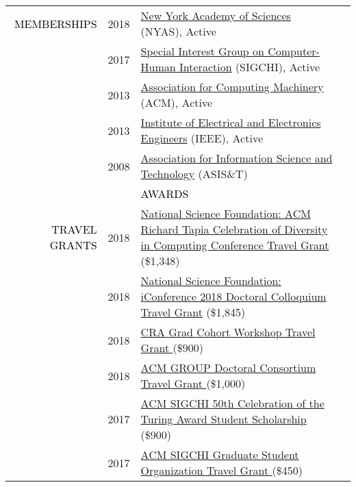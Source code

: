 \documentclass[12pt]{article}
\begin{document}
{{\begin{longtable}{Rp{1.0in}p{0.25in}p{4.75in}}
\textcolor{black}{\footnotesize{\uppercase{Memberships}}} & \footnotesize{2018} & \href{https://www.nyas.org/}{{New York Academy of Sciences}} (NYAS), Active \\

 & \footnotesize{2017} & \href{http://www.sigchi.org/}{{Special Interest Group on Computer-Human Interaction}} (SIGCHI), Active \\

& \footnotesize{2013} & \href{https://www.acm.org/}{{Association for Computing Machinery}} (ACM), Active \\

& \footnotesize{2013} & \href{https://www.ieee.org/}{{Institute of Electrical and Electronics Engineers}} (IEEE), Active \\

& \footnotesize{2008} & \href{https://www.asist.org/}{{Association for Information Science and Technology}} (ASIS\&T)
\bigskip \\

&&\par \Large \textcolor{black}{\uppercase{Awards}}\\ \hhline{~~-}

\textcolor{black}{\footnotesize{\uppercase{Travel Grants}}} & \footnotesize{2018} & \href{https://www.nsf.gov/awardsearch/showAward?AWD_ID=1823052}{{National Science Foundation: ACM Richard Tapia Celebration of Diversity in Computing Conference Travel Grant}} (\$1,348) \\

& \footnotesize{2018} & \href{https://www.nsf.gov/awardsearch/showAward?AWD_ID=1713738}{{National Science Foundation: iConference 2018 Doctoral Colloquium Travel Grant}} (\$1,845) \\

& \footnotesize{2018} & \href{https://cra.org/events/urmgradcohort/}{{CRA Grad Cohort Workshop Travel Grant} }(\$900) \\

& \footnotesize{2018} & \href{https://dl.acm.org/citation.cfm?id=3148330}{{ACM GROUP Doctoral Consortium Travel Grant} }(\$1,000) \\

& \footnotesize{2017} & \href{http://www.sigchi.org/news/sigchi-sponsors-students-to-attend-turing-award-celebration}{{ACM SIGCHI 50th Celebration of the Turing Award Student Scholarship} }(\$900) \\

& \footnotesize{2017} & \href{http://gradorg.syr.edu/travel-grant/}{{ACM SIGCHI Graduate Student Organization Travel Grant} }(\$450) \\


\end{longtable}}}
\end{document}
